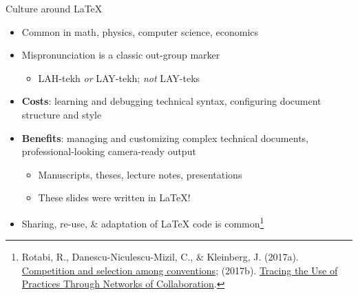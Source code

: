 \documentclass{cubeamer}
\begin{document}
\begin{frame}{Culture around \LaTeX}
    \begin{itemize}
        \item Common in math, physics, computer science, economics
        \item Mispronunciation is a classic out-group marker
        \begin{itemize}
            \item  LAH-tekh \textit{or} LAY-tekh; \textit{not} LAY-teks
        \end{itemize}
        \item \textbf{Costs}: learning and debugging technical syntax, configuring document structure and style
        \item \textbf{Benefits}: managing and customizing complex technical documents, professional-looking camera-ready output
        \begin{itemize}
            \item Manuscripts, theses, lecture notes, presentations
            \item These slides were written in \LaTeX!
        \end{itemize}
        \item Sharing, re-use, \& adaptation of \LaTeX{} code is common\footnote{Rotabi, R., Danescu-Niculescu-Mizil, C., \& Kleinberg, J. (2017a). \href{https://dl.acm.org/doi/abs/10.1145/3038912.3052652}{Competition and selection among conventions}; (2017b). \href{https://ojs.aaai.org/index.php/ICWSM/article/view/14870}{Tracing the Use of Practices Through Networks of Collaboration}.}
    \end{itemize}
\end{frame}
\end{document}
